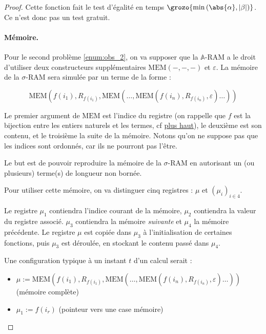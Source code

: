 \documentclass{report}
\newcommand{\bbA}{\mathbb{A}}
\begin{document}
\begin{proof}
					\espace
					
					Cette fonction fait le test d'égalité en temps $\grozo{\min\left(\abs{\alpha}, \left| \beta \right|\right)}$. Ce n'est donc pas un test gratuit. 
					
					
					\paragraph{Mémoire.}
					\label{par:A_RAM_memoire}
					Pour le second problème \ref{enum:obs_2}, on va supposer que la $\bbA$-RAM a le droit d'utiliser deux constructeurs supplémentaires $\text{MEM}(-,-,-)$ et $\varepsilon$. La mémoire de la $\sigma$-RAM sera simulée par un terme de la forme : 
					
					\[
						\text{MEM}(f(i_1), R_{f(i_1)}, \text{MEM}( \dots, \text{MEM}(f(i_n), R_{f(i_n)}, \varepsilon) \dots ) )
					\]
					
					Le premier argument de $\text{MEM}$ est l'indice du registre (on rappelle que $f$ est la bijection entre les entiers naturels et les termes, cf \hyperref[text:bijection_f]{plus haut}), le deuxième est son contenu, et le troisième la suite de la mémoire. Notons qu'on ne suppose pas que les indices sont ordonnés, car ils ne pourront pas l'être. 
					
					Le but est de pouvoir reproduire la mémoire de la $\sigma$-RAM en autorisant un (ou plusieurs) terme(s) de longueur non bornée. 
					
					Pour utiliser cette mémoire, on va distinguer cinq registres : $\mu$ et $\left( \mu_i \right)_{i \in 4}$.
					
					Le registre $\mu_1$ contiendra l'indice courant de la mémoire, $\mu_2$ contiendra la valeur du registre associé. $\mu_3$ contiendra la mémoire \emph{suivante} et $\mu_4$ la mémoire précédente. Le registre $\mu$ est copiée dans $\mu_3$ à l'initialisation de certaines fonctions, puis $\mu_3$ est déroulée, en stockant le contenu passé dans $\mu_4$. 
					
					Une configuration typique à un instant $t$ d'un calcul serait :

						
					\begin{itemize}
						\item 	
								$\mu := \text{MEM}(f(i_1), R_{f(i_1)}, \text{MEM}( \dots, \text{MEM}(f(i_n), R_{f(i_n)}, \varepsilon) \dots ) )$ (mémoire complète)
								
						\item 	
								$\mu_1 := f(i_r)$ (pointeur vers une case mémoire)
								

\end{itemize}
\end{proof}
\end{document}
